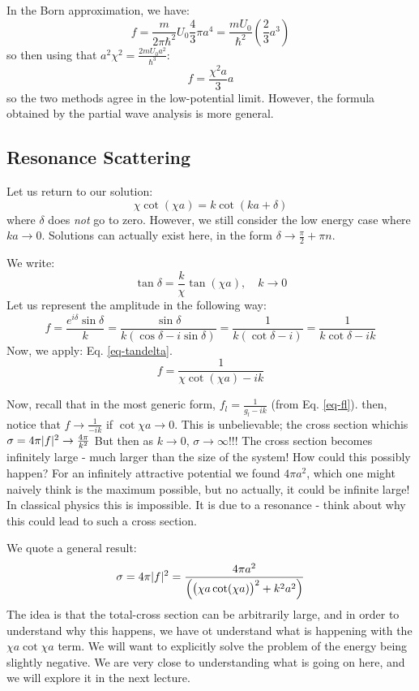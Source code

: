 In the Born approximation, we have:
\begin{equation}
    f = \frac{m}{2\pi \hbar^2}U_0 \frac{4}{3}\pi a^4 = \frac{mU_0}{\hbar^2}\left(\frac{2}{3}a^3\right)
\end{equation}
so then using that $a^2\chi^2 = \frac{2mU_0 a^2}{\hbar^3}$:
\begin{equation}
    f = \frac{\chi^2 a}{3}a
\end{equation}
so the two methods agree in the low-potential limit. However, the formula obtained by the partial wave analysis is more general.

\subsection{Resonance Scattering}
Let us return to our solution:
\begin{equation}
    \chi \cot(\chi a) = k \cot(ka + \delta)
\end{equation}
where $\delta$ does \emph{not} go to zero. However, we still consider the low energy case where $ka \to 0$. Solutions can actually exist here, in the form $\delta \to \frac{\pi}{2} + \pi n$.

We write:
\begin{equation}\label{eq-tandelta}
    \tan \delta = \frac{k}{\chi}\tan(\chi a), \quad k \to 0
\end{equation}
Let us represent the amplitude in the following way:
\begin{equation}
    f = \frac{e^{i\delta}\sin\delta}{k} = \frac{\sin \delta}{k(\cos \delta - i \sin \delta)} = \frac{1}{k(\cot \delta - i)} = \frac{1}{k\cot \delta - ik}
\end{equation}
Now, we apply: Eq. \eqref{eq-tandelta}.
\begin{equation}
    f = \frac{1}{\chi \cot(\chi a) - ik}
\end{equation}

Now, recall that in the most generic form, $f_l = \frac{1}{g_l - ik}$ (from Eq. \eqref{eq-fl}). then, notice that $f \to \frac{1}{-ik}$ if $\cot \chi a \to 0$. This is unbelievable; the cross section whichis $\sigma = 4\pi \lvert f \rvert^2 \to \frac{4\pi}{k^2}$ But then as $k \to 0$, $\sigma \to \infty$!!! The cross section becomes infinitely large - much larger than the size of the system! How could this possibly happen? For an infinitely attractive potential we found $4\pi a^2$, which one might naively think is the maximum possible, but no actually, it could be infinite large! In classical physics this is impossible. It is due to a resonance - think about why this could lead to such a cross section.

We quote a general result:
\begin{equation}
    \sigma = 4\pi \lvert f \rvert^2 = \frac{4\pi a^2}{\left(\left(\chi a\cot(\chi a)\right)^2 + k^2a^2\right)}
\end{equation}
The idea is that the total-cross section can be arbitrarily large, and in order to understand why this happens, we have ot understand what is happening with the $\chi a \cot \chi a$ term. We will want to explicitly solve the problem of the energy being slightly negative. We are very close to understanding what is going on here, and we will explore it in the next lecture.

